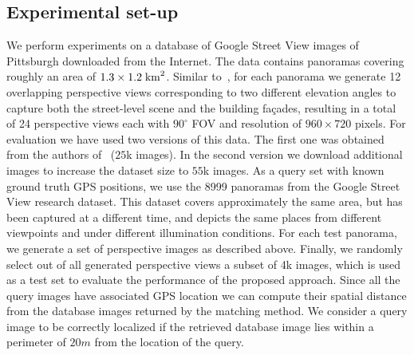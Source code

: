 \documentclass[10pt,twocolumn,letterpaper]{article}
\begin{document}
   \subsection{Experimental set-up}
      We perform experiments on a database of Google Street View images of Pittsburgh downloaded from the Internet. The data contains panoramas covering roughly an area of $1.3 \times 1.2 \; {\rm km}^2$.       
      Similar to~\cite{Chen11}, for each panorama we generate 12 overlapping perspective views corresponding to two different elevation angles to capture both the street-level scene and the building fa\c{c}ades, resulting in a total of 24 perspective views each with $90^\circ$ FOV and resolution of $960 \times 720$ pixels.
      For evaluation we have used two versions of this data. The first one was obtained from the authors of~\cite{Gronat13} ($25$k images). In the second version we download additional images to increase the dataset size to $55$k images. 
      As a query set with known ground truth GPS positions, we use the 8999 panoramas from the Google Street View research dataset. This dataset covers approximately the same area, but has been captured at a different time, and depicts the same places from different viewpoints and under different illumination conditions. For each test panorama, we generate a set of perspective images as described above. Finally, we randomly select out of all generated perspective views a subset of 4k images, which is used as a test set to evaluate the performance of the proposed approach.
      Since all the query images have associated GPS location we can compute their spatial distance from the database images returned by the matching method. We consider a query image to be correctly localized if the retrieved database image lies within a perimeter of $20m$ from the location of the query.
\end{document}
